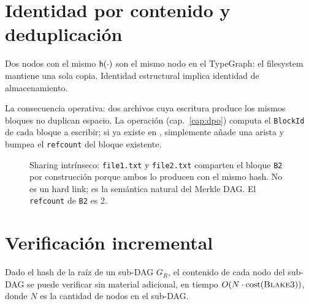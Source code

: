 \section{Identidad por contenido y deduplicación}

\begin{invariante}
\label{inv:identidad-contenido}
Dos nodos con el mismo $\mathsf{h}(\cdot)$ son el mismo nodo en el
TypeGraph: el filesystem mantiene una sola copia. Identidad estructural
implica identidad de almacenamiento.
\end{invariante}

La consecuencia operativa: dos archivos cuya escritura produce los
mismos bloques no duplican espacio. La operación \opwrite{}
(cap.~\ref{cap:dpo}) computa el \texttt{BlockId} de cada bloque a
escribir; si ya existe en , simplemente añade
una arista \epointsto{} y bumpea el \texttt{refcount} del bloque
existente.

\begin{figure}[h]
\centering
{}
\caption{Sharing intrínseco: \texttt{file1.txt} y \texttt{file2.txt}
comparten el bloque \texttt{B2} por construcción porque ambos lo
producen con el mismo hash. No es un hard link; es la semántica natural
del Merkle DAG. El \texttt{refcount} de \texttt{B2} es 2.}
\label{fig:hashing-sharing}
\end{figure}

\section{Verificación incremental}

\begin{teorema}
\label{teo:verificacion-incremental}
Dado el hash de la raíz de un sub-DAG $G_R$, el contenido de cada nodo
del sub-DAG se puede verificar sin material adicional, en tiempo $O(N
\cdot \mathrm{cost}(\textsc{Blake3}))$, donde $N$ es la cantidad de nodos en el
sub-DAG.
\end{teorema}

